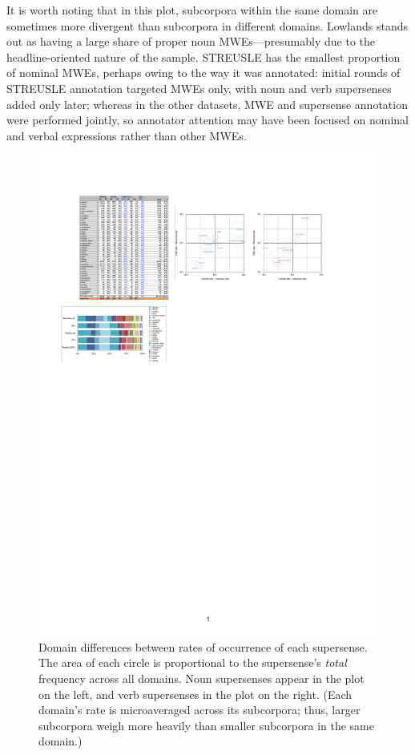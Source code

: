 \documentclass[11pt,letterpaper]{article}
\begin{document}
It is worth noting that in this plot, subcorpora within the same domain 
are sometimes more divergent than subcorpora in different domains. 
Lowlands stands out as having a large share of proper noun MWEs---presumably due to the headline-oriented 
nature of the sample. STREUSLE has the smallest proportion of nominal MWEs, 
perhaps owing to the way it was annotated: 
initial rounds of STREUSLE annotation targeted MWEs only, with noun and verb supersenses 
added only later; whereas in the other datasets, MWE and supersense annotation were performed jointly, 
so annotator attention may have been focused on nominal and verbal expressions 
rather than other MWEs.

\begin{figure}
\includegraphics[width=\textwidth]{figs/supersense-domains.pdf}
\caption{Domain differences between rates of occurrence of each supersense. 
The area of each circle is proportional to the supersense's \emph{total} frequency across all domains.
Noun supersenses appear in the plot on the left, and verb supersenses in the plot on the right. 
(Each domain's rate is microaveraged across its subcorpora; 
thus, larger subcorpora weigh more heavily than smaller subcorpora in the same domain.)}
\label{fig:supersense-domains}
\end{figure}
\end{document}
